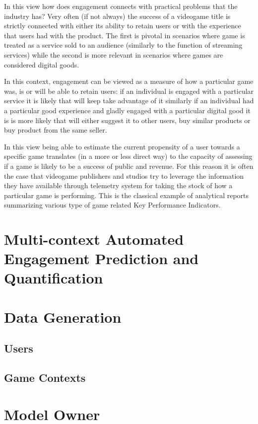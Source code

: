In this view how does engagement connects with practical problems that the industry has? Very often (if not always) the success of a videogame title is strictly connected with either its ability to retain users or with the experience that users had with the product. The first is pivotal in scenarios where game is treated as a service sold to an audience (similarly to the function of streaming services) while the second is more relevant in scenarios where games are considered digital goods. 

In this context, engagement can be viewed as a measure of how a particular game was, is or will be able to retain users: if an individual is engaged with a particular service it is likely that will keep take advantage of it similarly if an individual had a particular good experience and gladly engaged with a particular digital good it is is more likely that will either suggest it to other users, buy similar products or buy product from the same seller.  

In this view being able to estimate the current propensity of a user towards a specific game translates (in a more or less direct way) to the capacity of assessing if a game is likely to be a success of public and revenue. For this reason it is often the case that videogame publishers and studios try to leverage the information they have available through telemetry system for taking the stock of how a particular game is performing. This is the classical example of analytical reports summarizing various type of game related Key Performance Indicators. 

\section{Multi-context Automated Engagement Prediction and Quantification}
\label{industry_needs}

\section{Data Generation}
\lorem
\subsection{Users}
\lorem
\subsection{Game Contexts}
\lorem

\section{Model Owner}
\lorem
